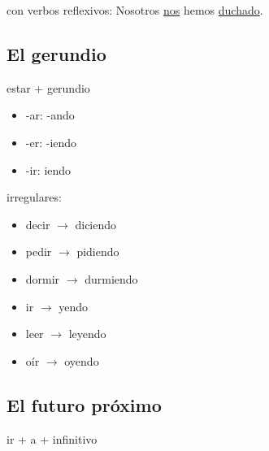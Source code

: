 \documentclass{article}
\begin{document}
	con verbos reflexivos: Nosotros \underline{nos} hemos \underline{duchado}.
	
	\subsection{El gerundio}\label{gerundium}
	
	estar + gerundio
	\begin{itemize}
		\item -ar: -ando
		\item -er: -iendo
		\item -ir: iendo
	\end{itemize}

	irregulares:
	\begin{itemize}
		\item decir $\to$ diciendo
		\item pedir $\to$ pidiendo
		\item dormir $\to$ durmiendo
		\item ir $\to$ yendo
		\item leer $\to$ leyendo
		\item oír $\to$ oyendo
	\end{itemize}

	\subsection{El futuro próximo}
	
	ir + a + infinitivo
\end{document}
